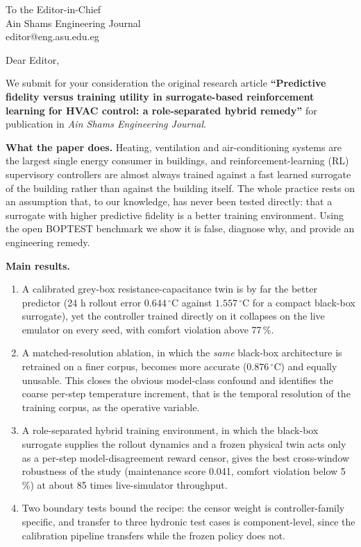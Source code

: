 \documentclass[11pt,a4paper]{article}
\begin{document}
To the Editor-in-Chief\\
Ain Shams Engineering Journal\\
editor@eng.asu.edu.eg

Dear Editor,

We submit for your consideration the original research article \textbf{``Predictive fidelity versus
training utility in surrogate-based reinforcement learning for HVAC control: a role-separated hybrid
remedy''} for publication in \emph{Ain Shams Engineering Journal}.

\textbf{What the paper does.} Heating, ventilation and air-conditioning systems are the largest
single energy consumer in buildings, and reinforcement-learning (RL) supervisory controllers are
almost always trained against a fast learned surrogate of the building rather than against the
building itself. The whole practice rests on an assumption that, to our knowledge, has never been
tested directly: that a surrogate with higher predictive fidelity is a better training environment.
Using the open BOPTEST benchmark we show it is false, diagnose why, and provide an engineering
remedy.

\textbf{Main results.}

\begin{enumerate}\itemsep2pt \parskip0pt
\item A calibrated grey-box resistance-capacitance twin is by far the better predictor (24 h
rollout error $0.644\,^{\circ}$C against $1.557\,^{\circ}$C for a compact black-box surrogate), yet
the controller trained directly on it collapses on the live emulator on every seed, with comfort
violation above 77\,\%.
\item A matched-resolution ablation, in which the \emph{same} black-box architecture is retrained on
a finer corpus, becomes more accurate ($0.876\,^{\circ}$C) and equally unusable. This closes the
obvious model-class confound and identifies the coarse per-step temperature increment, that is the
temporal resolution of the training corpus, as the operative variable.
\item A role-separated hybrid training environment, in which the black-box surrogate supplies the
rollout dynamics and a frozen physical twin acts only as a per-step model-disagreement reward
censor, gives the best cross-window robustness of the study (maintenance score 0.041, comfort
violation below 5\,\%) at about 85 times live-simulator throughput.
\item Two boundary tests bound the recipe: the censor weight is controller-family specific, and
transfer to three hydronic test cases is component-level, since the calibration pipeline transfers
while the frozen policy does not.
\end{enumerate}
\end{document}
